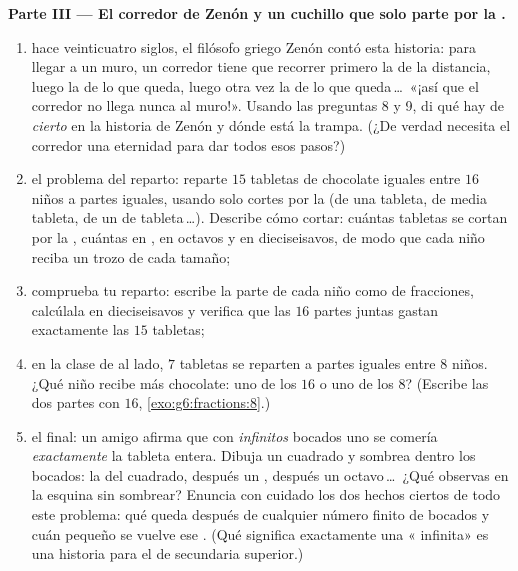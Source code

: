 \begin{problem}
\medskip
\noindent\textbf{Parte III --- El corredor de Zenón y un cuchillo que
solo parte por la .}
\begin{enumerate}[resume]
  \item hace veinticuatro siglos, el filósofo griego Zenón
        contó esta historia: para llegar a un muro, un corredor tiene que
        recorrer primero la  de la distancia, luego la  de lo que queda, luego
        otra vez la  de lo que queda\,\dots\ «¡así que el corredor no llega
        nunca al muro!». Usando las preguntas 8 y 9, di qué hay de
        \emph{cierto} en la historia de Zenón y dónde está la trampa.
        (¿De verdad necesita el corredor una eternidad para dar todos esos
        pasos?)
  \item el problema del reparto: reparte $15$ tabletas de chocolate iguales
        entre $16$ niños a partes iguales, usando solo cortes por la 
        (de una tableta, de media tableta, de un  de tableta\,\dots).
        Describe cómo cortar: cuántas tabletas se cortan por la ,
        cuántas en , en octavos y en dieciseisavos,
        de modo que cada niño reciba un trozo de cada tamaño;
  \item comprueba tu reparto: escribe la parte de cada niño como  de
        fracciones, calcúlala en dieciseisavos y verifica que las
        $16$ partes juntas gastan exactamente las $15$ tabletas;
  \item en la clase de al lado, $7$ tabletas se reparten a partes iguales entre
        $8$ niños. ¿Qué niño recibe más chocolate: uno
        de los $16$ o uno de los $8$? (Escribe las dos partes con
         $16$, \cref{exo:g6:fractions:8}.)
  \item el final: un amigo afirma que con \emph{infinitos}
        bocados uno se comería \emph{exactamente} la tableta entera.
        Dibuja un cuadrado y sombrea dentro los bocados: la  del
        cuadrado, después un , después un octavo\,\dots\ ¿Qué
        observas en la esquina sin sombrear? Enuncia con cuidado
        los dos hechos ciertos de todo este problema: qué queda
        después de cualquier número finito de bocados y cuán pequeño se vuelve ese
        . (Qué significa exactamente una « infinita»
        es una historia para el  de secundaria superior.)
\end{enumerate}
\end{problem}
